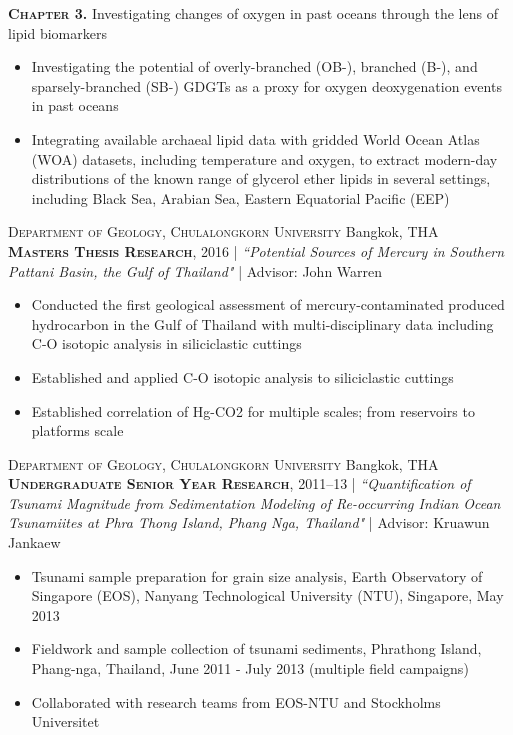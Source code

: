 \documentclass[10pt, letter]{article}
\begin{document}
\textbf{\textsc{Chapter 3.}} Investigating changes of oxygen in past oceans through the lens of lipid biomarkers
\begin{itemize}[leftmargin=*]
    \item Investigating the potential of overly-branched (OB-), branched (B-), and sparsely-branched (SB-) GDGTs as a proxy for oxygen deoxygenation events in past oceans
    \item Integrating available archaeal lipid data with gridded World Ocean Atlas (WOA) datasets, including temperature and oxygen, to extract modern-day distributions of the known range of glycerol ether lipids in several settings, including Black Sea, Arabian Sea, Eastern Equatorial Pacific (EEP)
\end{itemize}  

\bigskip
\textsc{Department of Geology, Chulalongkorn University} \hfill Bangkok, THA \\
\textsc{\textbf{Masters Thesis Research}}, 2016 | \textit{``Potential Sources of Mercury in Southern Pattani Basin, the Gulf of Thailand"} | Advisor: John Warren 

\begin{itemize}[leftmargin=*]
    \item Conducted the first geological assessment of mercury-contaminated produced hydrocarbon in the Gulf of Thailand with multi-disciplinary data including C-O isotopic analysis in siliciclastic cuttings
    \item Established and applied C-O isotopic analysis to siliciclastic cuttings
    \item Established correlation of Hg-CO2 for multiple scales; from reservoirs to platforms scale
\end{itemize}  

\bigskip
\textsc{Department of Geology, Chulalongkorn University} \hfill Bangkok, THA \\
\textsc{\textbf{Undergraduate Senior Year Research}}, 2011–13 | \textit{``Quantification of Tsunami Magnitude from Sedimentation Modeling of Re-occurring Indian Ocean Tsunamiites at Phra Thong Island, Phang Nga, Thailand"} | Advisor: Kruawun Jankaew
\begin{itemize}[leftmargin=*]
    \item Tsunami sample preparation for grain size analysis, Earth Observatory of Singapore (EOS), Nanyang Technological University (NTU), Singapore, May 2013
    \item Fieldwork and sample collection of tsunami sediments, Phrathong Island, Phang-nga, Thailand, June 2011 - July 2013 (multiple field campaigns)
    \item Collaborated with research teams from EOS-NTU and Stockholms Universitet
\end{itemize}  
\end{document}
